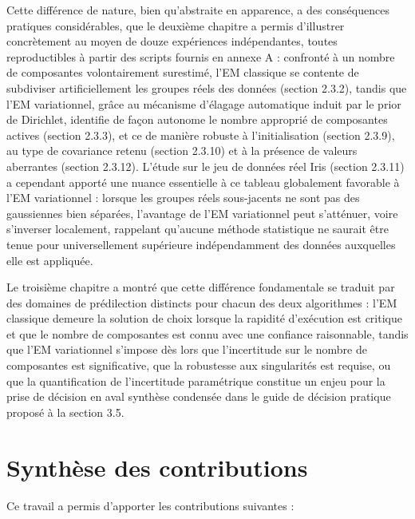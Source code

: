 Cette différence de nature, bien qu'abstraite en apparence, a des conséquences pratiques considérables, que le deuxième chapitre a permis d'illustrer concrètement au moyen de douze expériences indépendantes, toutes reproductibles à partir des scripts fournis en annexe A : confronté à un nombre de composantes volontairement surestimé, l'EM classique se contente de subdiviser artificiellement les groupes réels des données (section 2.3.2), tandis que l'EM variationnel, grâce au mécanisme d'élagage automatique induit par le prior de Dirichlet, identifie de façon autonome le nombre approprié de composantes actives (section 2.3.3), et ce de manière robuste à l'initialisation (section 2.3.9), au type de covariance retenu (section 2.3.10) et à la présence de valeurs aberrantes (section 2.3.12). L'étude sur le jeu de données réel Iris (section 2.3.11) a cependant apporté une nuance essentielle à ce tableau globalement favorable à l'EM variationnel : lorsque les groupes réels sous-jacents ne sont pas des gaussiennes bien séparées, l'avantage de l'EM variationnel peut s'atténuer, voire s'inverser localement, rappelant qu'aucune méthode statistique ne saurait être tenue pour universellement supérieure indépendamment des données auxquelles elle est appliquée.

Le troisième chapitre a montré que cette différence fondamentale se traduit par des domaines de prédilection distincts pour chacun des deux algorithmes : l'EM classique demeure la solution de choix lorsque la rapidité d'exécution est critique et que le nombre de composantes est connu avec une confiance raisonnable, tandis que l'EM variationnel s'impose dès lors que l'incertitude sur le nombre de composantes est significative, que la robustesse aux singularités est requise, ou que la quantification de l'incertitude paramétrique constitue un enjeu pour la prise de décision en aval  synthèse condensée dans le guide de décision pratique proposé à la section 3.5.

\section*{Synthèse des contributions}
Ce travail a permis d'apporter les contributions suivantes :

